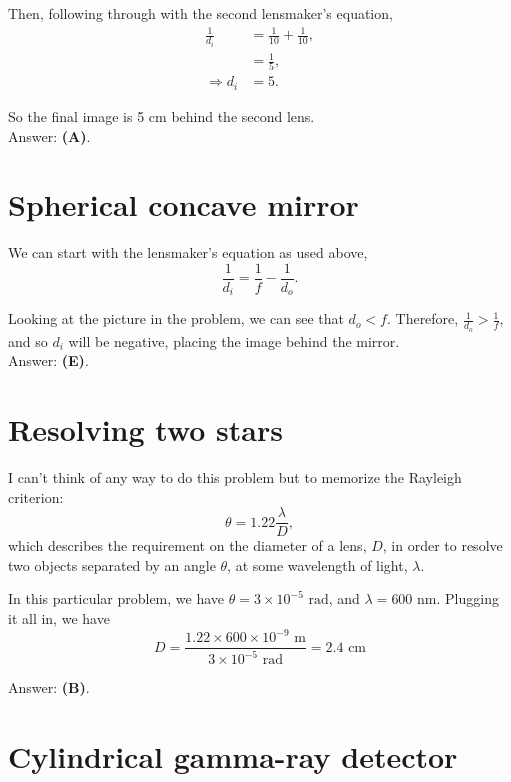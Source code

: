 \documentclass[11pt]{paper}
\newcommand{\answer}[1]{Answer: \textbf{(#1)}.}
\begin{document}
Then, following through with the second lensmaker's equation,
\begin{align}
\frac{1}{d_i} &= \frac{1}{10} + \frac{1}{10},\\
&= \frac{1}{5},\\
\Rightarrow d_i &= 5.
\end{align}

So the final image is 5 cm behind the second lens.\\

\answer{A}

\section{Spherical concave mirror}
We can start with the lensmaker's equation as used above,
\begin{equation}
\frac{1}{d_i} = \frac{1}{f} - \frac{1}{d_o}.
\end{equation}

Looking at the picture in the problem, we can see that $d_o < f$.  Therefore, $\frac{1}{d_o} > \frac{1}{f}$, and so $d_i$ will be negative, placing the image behind the mirror.\\

\answer{E}

\section{Resolving two stars}
I can't think of any way to do this problem but to memorize the Rayleigh criterion:
\begin{equation}
\theta = 1.22\frac{\lambda}{D},
\end{equation}
which describes the requirement on the diameter of a lens, $D$, in order to resolve two objects separated by an angle $\theta$, at some wavelength of light, $\lambda$.

In this particular problem, we have $\theta = 3 \times 10^{-5} \text{ rad}$, and $\lambda = 600\text{ nm}$.  Plugging it all in, we have
\begin{equation}
D = \frac{1.22 \times 600 \times 10^{-9}\text{ m}}{3 \times 10^{-5}\text{ rad}} = 2.4 \text{ cm}
\end{equation}

\answer{B}

\section{Cylindrical gamma-ray detector}
\end{document}
